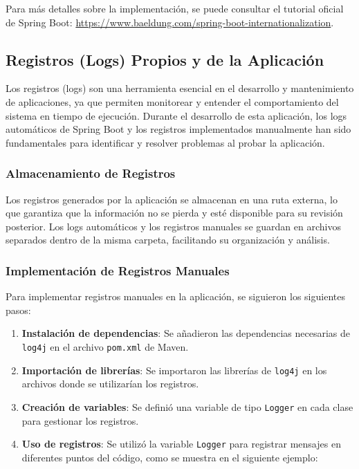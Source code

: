 \documentclass[draft]{scrbook}
\begin{document}
Para más detalles sobre la implementación, se puede consultar el tutorial oficial de Spring Boot: \url{https://www.baeldung.com/spring-boot-internationalization}.


\subsection{Registros (Logs) Propios y de la Aplicación}
\label{subsec:logs}

Los registros (logs) son una herramienta esencial en el desarrollo y mantenimiento de aplicaciones, ya que permiten monitorear y entender el comportamiento del sistema en tiempo de ejecución. Durante el desarrollo de esta aplicación, los logs automáticos de Spring Boot y los registros implementados manualmente han sido fundamentales para identificar y resolver problemas al probar la aplicación.

\subsubsection{Almacenamiento de Registros}

Los registros generados por la aplicación se almacenan en una ruta externa, lo que garantiza que la información no se pierda y esté disponible para su revisión posterior. Los logs automáticos y los registros manuales se guardan en archivos separados dentro de la misma carpeta, facilitando su organización y análisis.

\subsubsection{Implementación de Registros Manuales}

Para implementar registros manuales en la aplicación, se siguieron los siguientes pasos:

\begin{enumerate}
    \item \textbf{Instalación de dependencias}: Se añadieron las dependencias necesarias de \texttt{log4j} en el archivo \texttt{pom.xml} de Maven.
    \item \textbf{Importación de librerías}: Se importaron las librerías de \texttt{log4j} en los archivos donde se utilizarían los registros.
    \item \textbf{Creación de variables}: Se definió una variable de tipo \texttt{Logger} en cada clase para gestionar los registros.
    \item \textbf{Uso de registros}: Se utilizó la variable \texttt{Logger} para registrar mensajes en diferentes puntos del código, como se muestra en el siguiente ejemplo:
\end{enumerate}
\end{document}
